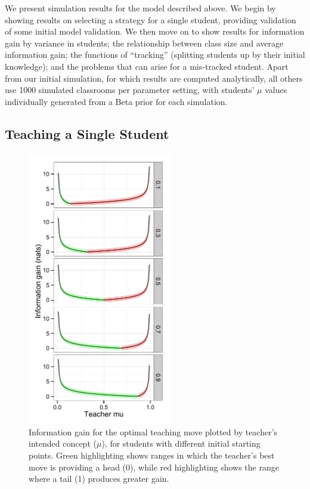 \documentclass[10pt,letterpaper]{article}
\begin{document}
We present simulation results for the model described above. We begin by showing results on selecting a strategy for a single student, providing validation of some initial model validation. We then move on to show results for information gain by variance in students; the relationship between class size and average information gain; the functions of ``tracking'' (splitting students up by their initial knowledge); and the problems that can arise for a mis-tracked student. Apart from our initial simulation, for which results are computed analytically, all others use 1000 simulated classrooms per parameter setting, with students' $\mu$ values individually generated from a Beta prior for each simulation.

\subsection{Teaching a Single Student}

\begin{figure}[t]
\begin{center}
\includegraphics[width=2.5in]{figures/single_student_gain.pdf}
\end{center}
\caption{\label{fig:student} Information gain for the optimal teaching move plotted by teacher's intended concept ($\mu$), for students with different initial starting points. Green highlighting shows ranges in which the teacher's best move is providing a head (0), while red highlighting shows the range where a tail (1) produces greater gain.}
\end{figure}
\end{document}
